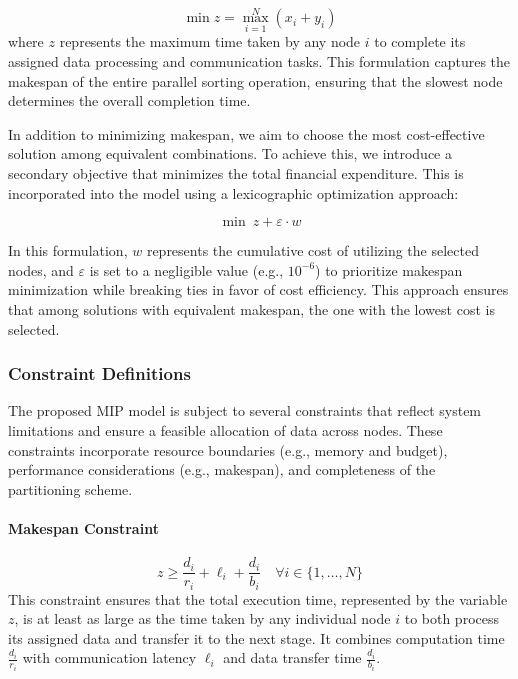 \documentclass[]{interact}
\theoremstyle{plain}
\theoremstyle{definition}
\theoremstyle{remark}
\begin{document}
\begin{equation}
    \min z = \max_{i=1}^N (x_i + y_i)
\end{equation}
where $z$ represents the maximum time taken by any node $i$ to complete its assigned data processing and communication tasks. This formulation captures the makespan of the entire parallel sorting operation, ensuring that the slowest node determines the overall completion time.

In addition to minimizing makespan, we aim to choose the most cost-effective solution among equivalent combinations. To achieve this, we introduce a secondary objective that minimizes the total financial expenditure. This is incorporated into the model using a lexicographic optimization approach:

\begin{equation}
    \min \ z + \varepsilon \cdot w
\end{equation}

In this formulation, $w$ represents the cumulative cost of utilizing the selected nodes, and $\varepsilon$ is set to a negligible value (e.g., $10^{-6}$) to prioritize makespan minimization while breaking ties in favor of cost efficiency. This approach ensures that among solutions with equivalent makespan, the one with the lowest cost is selected.

\subsubsection{Constraint Definitions}

The proposed MIP model is subject to several constraints that reflect system limitations and ensure a feasible allocation of data across nodes. These constraints incorporate resource boundaries (e.g., memory and budget), performance considerations (e.g., makespan), and completeness of the partitioning scheme.

\paragraph{Makespan Constraint}
\begin{equation}
    z \geq \frac{d_i}{r_i} + \ell_i + \frac{d_i}{b_i} \quad \forall i \in \{1, \ldots, N\}
\end{equation}
This constraint ensures that the total execution time, represented by the variable $z$, is at least as large as the time taken by any individual node $i$ to both process its assigned data and transfer it to the next stage. It combines computation time $\frac{d_i}{r_i}$ with communication latency $\ell_i$ and data transfer time $\frac{d_i}{b_i}$.
\end{document}
